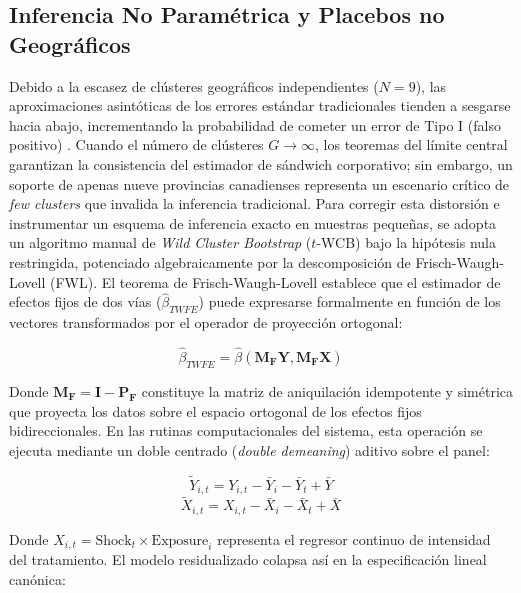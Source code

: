 \subsection{Inferencia No Param\'etrica y Placebos no Geogr\'aficos}
\label{sec:A_6}

Debido a la escasez de cl\'usteres geogr\'aficos independientes ($N=9$), las aproximaciones asint\'oticas de los errores est\'andar tradicionales tienden a sesgarse hacia abajo, incrementando la probabilidad de cometer un error de Tipo I (falso positivo) \citep{cameron2006robust}. Cuando el n\'umero de cl\'usteres $G \to \infty$, los teoremas del l\'imite central garantizan la consistencia del estimador de s\'andwich corporativo; sin embargo, un soporte de apenas nueve provincias canadienses representa un escenario cr\'itico de \textit{few clusters} que invalida la inferencia tradicional. Para corregir esta distorsi\'on e instrumentar un esquema de inferencia exacto en muestras peque\~nas, se adopta un algoritmo manual de \textit{Wild Cluster Bootstrap} ($t$-WCB) bajo la hip\'otesis nula restringida, potenciado algebraicamente por la descomposici\'on de Frisch-Waugh-Lovell (FWL).
El teorema de Frisch-Waugh-Lovell establece que el estimador de efectos fijos de dos v\'ias ($\hat{\beta}_{TWFE}$) puede expresarse formalmente en funci\'on de los vectores transformados por el operador de proyecci\'on ortogonal:

\begin{equation}
    \hat{\beta}_{TWFE} = \hat{\beta} \left( \mathbf{M}_{\mathbf{F}}\mathbf{Y}, \mathbf{M}_{\mathbf{F}}\mathbf{X} \right)
\end{equation}

Donde $\mathbf{M}_{\mathbf{F}} = \mathbf{I} - \mathbf{P}_{\mathbf{F}}$ constituye la matriz de aniquilaci\'on idempotente y sim\'etrica que proyecta los datos sobre el espacio ortogonal de los efectos fijos bidireccionales. En las rutinas computacionales del sistema, esta operaci\'on se ejecuta mediante un doble centrado (\textit{double demeaning}) aditivo sobre el panel:

\begin{equation}
    \tilde{Y}_{i,t} = Y_{i,t} - \bar{Y}_i - \bar{Y}_t + \bar{Y}
\end{equation}
\begin{equation}
    \tilde{X}_{i,t} = X_{i,t} - \bar{X}_i - \bar{X}_t + \bar{X}
\end{equation}

Donde $X_{i,t} = \text{Shock}_t \times \text{Exposure}_i$ representa el regresor continuo de intensidad del tratamiento. El modelo residualizado colapsa as\'i en la especificaci\'on lineal can\'onica:

